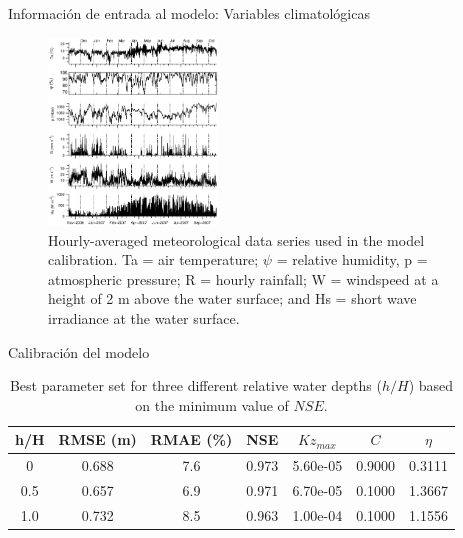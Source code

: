 \documentclass[
10pt,
aspectratio=169,
]{beamer}
\begin{document}
\begin{frame}{Información de entrada al modelo: Variables climatológicas}
\vspace{-0.2cm}
\begin{figure}[!htbp]
  \begin{center}
      \includegraphics[width=0.4\textwidth]{metVarCaliNew}
    \caption{\tiny Hourly-averaged meteorological data series used in the model calibration. Ta = air temperature; $\psi$  = relative humidity, p = atmospheric pressure; R = hourly rainfall; W = windspeed at a height of 2 m  above the water surface; and Hs = short wave irradiance at the water surface.}
    \label{metVarCali}
  \end{center}
\end{figure}
\end{frame}

\begin{frame}{Calibraci\'on del modelo}
\begin{table}
\centering
\caption{Best parameter set for three different relative water depths ($h/H$) based on the minimum value of $NSE$.}
\begin{tabular}{ccccccc}
\toprule
 h/H & RMSE (m) & RMAE (\%) & NSE & \textbf{$Kz_{max}$} & \textbf{$C$} & \textbf{$\eta$} \\
\midrule 
0 &	  0.688   &	 7.6   &	 0.973  &	 5.60e-05 &	 0.9000 &	 0.3111\\
0.5 &	  0.657  &	6.9  &	 0.971  &	 6.70e-05 &	 0.1000 &	 1.3667\\
1.0 & 	  0.732  &	 8.5   &	 0.963  &	 1.00e-04 &	 0.1000 &	 1.1556\\
\bottomrule
\end{tabular}
\label{paralev}
\end{table}
\end{frame}
\end{document}

